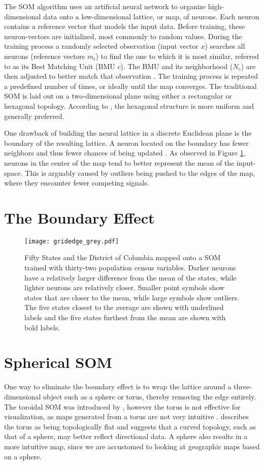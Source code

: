 The SOM algorithm uses an artificial neural network to organize
high-dimensional data onto a low-dimensional lattice, or map, of neurons.
Each neuron contains a reference vector that models the input data.  Before
training, these neuron-vectors are initialized, most commonly to random
values.  During the training process a randomly selected observation (input
vector $x$) searches all neurons (reference vectors $m_i$) to find the one to
which it is most similar, referred to as its Best Matching Unit (BMU $c$).
The BMU and its neighborhood ($N_c$) are then adjusted to better match that
observation \citep{Kohonen2000}.  The training process is repeated a
predefined number of times, or ideally until the map converges. The
traditional SOM is laid out on a two-dimensional plane using either a
rectangular or hexagonal topology.  According to \cite{wu2006}, the hexagonal
structure is more uniform and generally preferred.

One drawback of building the neural lattice in a discrete Euclidean plane is the
boundary of the resulting lattice.  A neuron located on the boundary has fewer
neighbors and thus fewer chances of being updated \citep{wu2006}.  As observed
in Figure \ref{figure1}, neurons in the center of the map tend to better
represent the mean of the input-space.  This is arguably caused by outliers
being pushed to the edges of the map, where they encounter fewer competing
signals.


\section{The Boundary Effect}


\begin{figure}
\centering
\texttt{[image: gridedge\_grey.pdf]}
\caption{Fifty States and the District of Columbia mapped onto a
SOM trained with thirty-two population census variables.  Darker neurons have a
relatively larger difference from the mean of the states, while lighter
neurons are relatively closer.  Smaller point symbols show states that are closer to the
mean, while large symbols show outliers. The five states closest to the average are shown
with underlined labels and the five states furthest from the mean are shown with
bold labels.}
\label{figure1}
\end{figure}

\section{Spherical SOM}
One way to eliminate the boundary effect is to wrap the lattice around a
three-dimensional object such as a sphere or torus, thereby removing the edge
entirely. The toroidal SOM was introduced by \cite{li1993}, however the torus is
not effective for visualization, as maps generated from a torus are not
very intuitive \citep{ito2000,wu2006}.  \cite{ritter99} describes the torus as
being topologically flat and suggests that a curved topology, such as that of a
sphere, may better reflect directional data.  A sphere also results in a more
intuitive map, since we are accustomed to looking at geographic maps based on a sphere.

